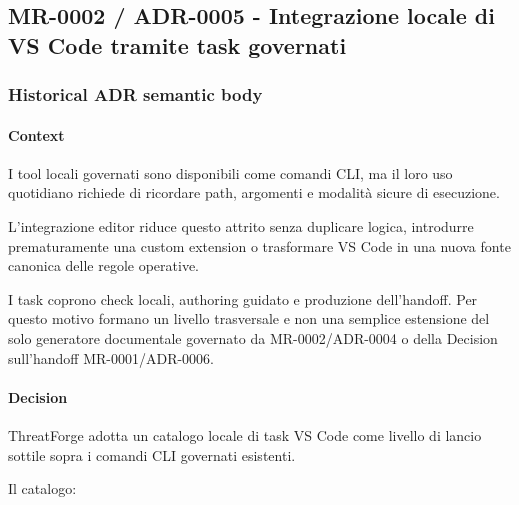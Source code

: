 \documentclass[
  10pt,
]{article}
\begin{document}
\subsection{MR-0002 / ADR-0005 - Integrazione locale di VS Code tramite
task
governati}\label{mr-0002-adr-0005---integrazione-locale-di-vs-code-tramite-task-governati}

\subsubsection{Historical ADR semantic
body}\label{historical-adr-semantic-body-13}

\paragraph{Context}\label{context-26}

I tool locali governati sono disponibili come comandi CLI, ma il loro
uso quotidiano richiede di ricordare path, argomenti e modalità sicure
di esecuzione.

L'integrazione editor riduce questo attrito senza duplicare logica,
introdurre prematuramente una custom extension o trasformare VS Code in
una nuova fonte canonica delle regole operative.

I task coprono check locali, authoring guidato e produzione
dell'handoff. Per questo motivo formano un livello trasversale e non una
semplice estensione del solo generatore documentale governato da
MR-0002/ADR-0004 o della Decision sull'handoff MR-0001/ADR-0006.

\paragraph{Decision}\label{decision-26}

ThreatForge adotta un catalogo locale di task VS Code come livello di
lancio sottile sopra i comandi CLI governati esistenti.

Il catalogo:
\end{document}

